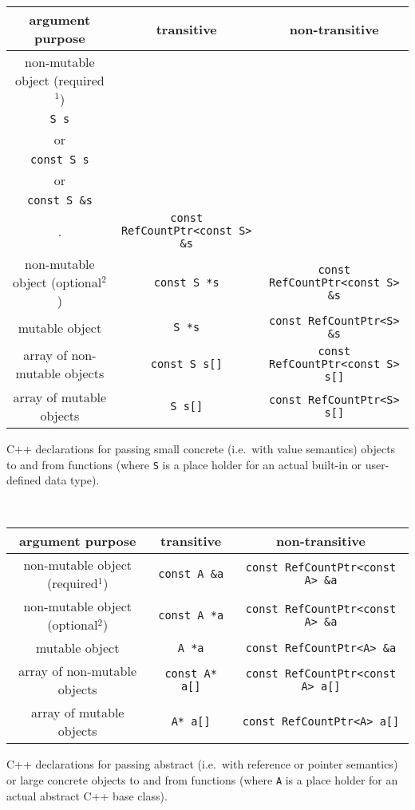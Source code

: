 \documentclass[pdf,ps2pdf,11pt]{SANDreport}
\begin{document}
%
\begin{minipage}{{}\textwidth}
\begin{tabular}{|c|c|c|}
\hline
argument purpose
& transitive
& non-transitive \\
\hline
non-mutable object (required$^1$)
& \begin{minipage}{12ex}
    \begin{center}
    {\tiny .}\\
    {}\texttt{S s} \\
    or \\
    {}\texttt{const S s} \\
    or \\
    {}\texttt{const S \&s} \\
    {\tiny .}
    \end{center}
  \end{minipage}
& {}\texttt{const RefCountPtr<const S> \&s} \\
\hline
non-mutable object (optional$^2$)
& {}\texttt{const S *s}
& {}\texttt{const RefCountPtr<const S> \&s} \\
\hline
mutable object
& {}\texttt{S *s}
& {}\texttt{const RefCountPtr<S> \&s} \\
\hline
array of non-mutable objects
& {}\texttt{const S s[]}
& {}\texttt{const RefCountPtr<const S> s[]} \\
\hline
array of mutable objects
& {}\texttt{S s[]}
& {}\texttt{const RefCountPtr<S> s[]} \\
\hline
\end{tabular}
\begin{center}
C++ declarations for passing small concrete (i.e.~with value
semantics) objects to and from functions (where {}\texttt{S} is a
place holder for an actual built-in or user-defined data type).
\end{center}
\end{minipage}
%
\\[5ex]
%
\begin{minipage}{{}\textwidth}
\begin{tabular}{|c|c|c|}
\hline
argument purpose
& transitive
& non-transitive \\
\hline
non-mutable object (required$^1$)
& {}\texttt{const A \&a}
& {}\texttt{const RefCountPtr<const A> \&a} \\
\hline
non-mutable object (optional$^2$)
& {}\texttt{const A *a}
& {}\texttt{const RefCountPtr<const A> \&a} \\
\hline
mutable object
& {}\texttt{A *a}
& {}\texttt{const RefCountPtr<A> \&a} \\
\hline
array of non-mutable objects
& {}\texttt{const A* a[]}
& {}\texttt{const RefCountPtr<const A> a[]} \\
\hline
array of mutable objects
& {}\texttt{A* a[]}
& {}\texttt{const RefCountPtr<A> a[]} \\
\hline
\end{tabular}
\begin{center}
C++ declarations for passing abstract (i.e.~with reference or pointer
semantics) or large concrete objects to and from functions (where
{}\texttt{A} is a place holder for an actual abstract C++ base class).
\end{center}
\end{minipage}
\end{document}

